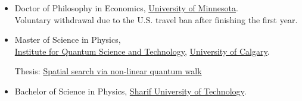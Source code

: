 \documentclass[10pt]{article}
\newenvironment{outerlist}[1][\enskip\textbullet]%
        {\begin{itemize}[#1,leftmargin=*]}{\end{itemize}%
         \vspace{-.6\baselineskip}}
\begin{document}
\begin{outerlist}
\item Doctor of Philosophy in Economics, \href{http://cla.umn.edu/economics}
              {University of Minnesota}.  \\
             Voluntary withdrawal due to the U.S. travel ban after finishing the first year.
%            
%       
%                       
             
\end{outerlist}
\begin{outerlist}
\item Master of Science in Physics, \hspace{2mm} \\ \href{http://www.iqst.ca/}{Institute for Quantum Science and Technology}, \href{http://www.ucalgary.ca/}{University of Calgary}.
           
         Thesis: \href{https://prism.ucalgary.ca/server/api/core/bitstreams/4d5c8717-bab1-4a7d-8caf-32610ab36d2a/content}
             {Spatial search via non-linear quantum walk}\\
       
\end{outerlist}


\begin{outerlist}
\item Bachelor of Science in Physics, 
             \href{http://www.sharif.ir/web/en/}{Sharif University of Technology}.
       
\end{outerlist}
\end{document}

